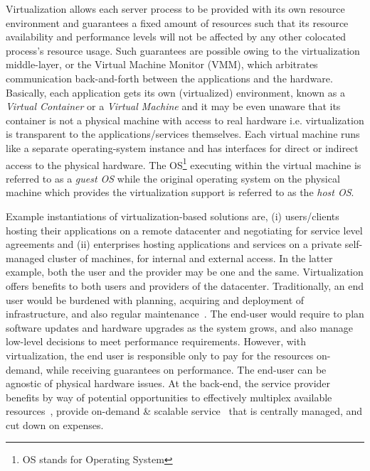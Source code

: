 Virtualization allows each server process to be provided with its own
resource environment and guarantees a fixed amount of resources such that
its resource availability and performance levels will not be affected by
any other colocated process's resource usage.
Such guarantees are possible owing to the
virtualization middle-layer, or the 
Virtual Machine Monitor (VMM), which
arbitrates communication back-and-forth between the applications and the
hardware. Basically, each application gets
its own (virtualized) environment, 
known as a \textit{Virtual Container} or a
\textit{Virtual Machine} and it may be even unaware that 
its container is not a
physical machine with access to real hardware i.e. virtualization is
transparent to the applications/services themselves. Each virtual machine
runs like a separate operating-system instance and has interfaces for
direct or indirect access to the physical hardware. The OS\footnote{OS stands
for Operating System} executing within the virtual machine is referred to
as a \textit{guest OS} while the original 
operating system on the physical
machine which provides the virtualization support is referred to as
the \textit{host OS}.

Example instantiations of
virtualization-based solutions are, (i) users/clients hosting their
applications on a remote datacenter 
and negotiating for service level agreements
and (ii) enterprises hosting applications and services on a
private self-managed cluster of machines, for internal and external
access.
In the latter
example, both the user and the provider may be one and the same.
Virtualization offers benefits to both users and providers 
of the datacenter.
Traditionally, an end user would be burdened with planning, acquiring
and deployment of infrastructure, 
and also regular maintenance~\cite{berkeley-view}. The end-user
would require to plan software updates and hardware upgrades as the system
grows, and also manage low-level decisions to meet performance
requirements. However, with virtualization, the end user is responsible only
to pay for the resources on-demand, while receiving guarantees on performance.
The end-user can be agnostic of physical hardware issues. At the back-end,
the service provider benefits by way of potential opportunities to
effectively multiplex available resources~\cite{vm-multiplexing}, 
provide on-demand \& scalable service~\cite{google-live-migration} 
that is centrally managed, and cut down on expenses.


